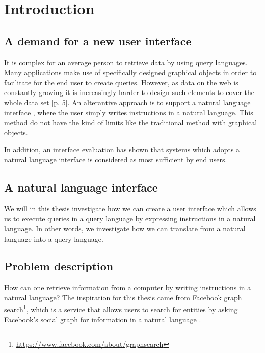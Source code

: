 \chapter{Introduction}\label{ch:introduction}
\section{A demand for a new user interface}
It is complex for an average person to retrieve data by using query languages. Many applications make use of specifically designed graphical objects in order to facilitate for the end user to create queries. However, as data on the web is constantly growing it is increasingly harder to design such elements to cover the whole data set \cite{damljanovic:2011}[p. 5].
\newline
\newline
An alterantive approach is to support a natural language interface , where the user simply writes instructions in a natural language. This method do not have the kind of limits like the traditional method with graphical objects.

In addition, an interface evaluation has shown that systems which adopts a natural language interface is considered as most sufficient by end users. \cite{kaufmann:2007}

\section{A natural language interface}
We will in this thesis investigate how we can create a user interface which allows us to execute queries in a query language by expressing instructions in a natural language. In other words, we investigate how we can translate from a natural language into a query language. 

\section{Problem description\label{sec:problem-description}}
How can one retrieve information from a computer by writing instructions in a natural language? The inspiration for this thesis came from Facebook graph search\footnote{\url{https://www.facebook.com/about/graphsearch}}, which is a service that allows users to search for entities by asking Facebook's social graph for information in a natural language \cite{unicorn}.

